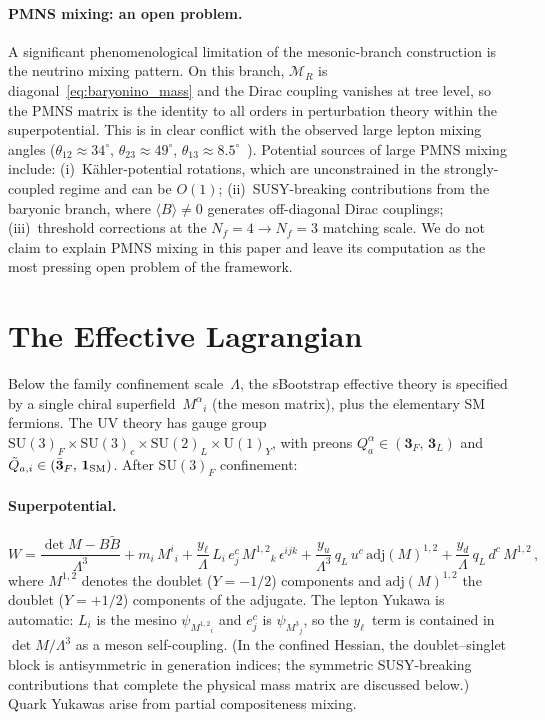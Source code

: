 \documentclass[12pt,a4paper]{article}
\newcommand{\SU}{\mathrm{SU}}
\newcommand{\UU}{\mathrm{U}}
\newcommand{\Nf}{N_f}
\newcommand{\adj}{\mathrm{adj}}
\begin{document}
\paragraph{PMNS mixing: an open problem.}
A significant phenomenological limitation of the mesonic-branch
construction is the neutrino mixing pattern. On this branch,
$\mathcal{M}_R$ is diagonal~\eqref{eq:baryonino_mass} and
the Dirac coupling vanishes at tree level, so
the PMNS matrix is the identity to all orders in perturbation theory
within the superpotential.
This is in clear conflict with the observed large lepton mixing
angles ($\theta_{12} \approx 34^\circ$, $\theta_{23} \approx 49^\circ$,
$\theta_{13} \approx 8.5^\circ$~\cite{NuFIT:2024}).
Potential sources of large PMNS mixing include:
(i)~K\"ahler-potential rotations, which are unconstrained in the
strongly-coupled regime and can be $O(1)$;
(ii)~SUSY-breaking contributions from the baryonic branch,
where $\langle B\rangle \neq 0$ generates off-diagonal Dirac couplings;
(iii)~threshold corrections at the $\Nf=4 \to \Nf=3$ matching scale.
We do not claim to explain PMNS mixing in this paper and leave its
computation as the most pressing open problem of the framework.


\section{The Effective Lagrangian}
\label{sec:lagrangian}

Below the family confinement scale~$\Lambda$, the sBootstrap effective
theory is specified by a single chiral superfield~$M^{\alpha}{}_i$
(the meson matrix), plus the elementary SM fermions. The UV theory has
gauge group $\SU(3)_F \times \SU(3)_c \times \SU(2)_L \times
\UU(1)_Y$, with preons $Q^\alpha_a \in (\mathbf{3}_F,\,
\mathbf{3}_L)$ and $\tilde{Q}_{a,i} \in (\bar{\mathbf{3}}_F,\,
\mathbf{1}_{\rm SM})$. After $\SU(3)_F$ confinement:

\paragraph{Superpotential.}
\begin{equation}
  W = \frac{\det M - B\tilde{B}}{\Lambda^3} + m_i\,M^i{}_i
    + \frac{y_\ell}{\Lambda}\,L_i\,e^c_j\,M^{1,2}{}_k\,\epsilon^{ijk}
    + \frac{y_u}{\Lambda^3}\,q_L\,u^c\,\adj(M)^{1,2}
    + \frac{y_d}{\Lambda}\,q_L\,d^c\,M^{1,2}\,,
  \label{eq:Wfull}
\end{equation}
where $M^{1,2}$ denotes the doublet ($Y{=}{-}1/2$) components and
$\adj(M)^{1,2}$ the doublet ($Y{=}{+}1/2$) components of the adjugate.
The lepton Yukawa is automatic: $L_i$ is the mesino
$\psi_{M^{1,2}{}_i}$ and $e^c_j$ is $\psi_{M^3{}_j}$, so the
$y_\ell$~term is contained in $\det M/\Lambda^3$ as a meson
self-coupling. (In the confined Hessian, the doublet--singlet block is
antisymmetric in generation indices; the symmetric SUSY-breaking
contributions that complete the physical mass matrix are discussed
below.) Quark Yukawas arise from partial compositeness mixing.
\end{document}
